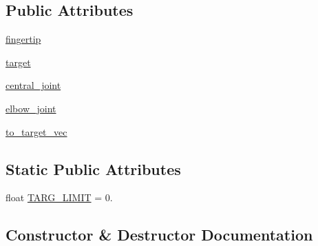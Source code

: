 \subsection*{Public Attributes}
\begin{DoxyCompactItemize}
\item 
\hyperlink{classpybullet-gym_1_1pybulletgym_1_1envs_1_1mujoco_1_1robots_1_1manipulators_1_1reacher_1_1_reacher_a02419457d08c665163da2a7c01dc09d4}{fingertip}
\item 
\hyperlink{classpybullet-gym_1_1pybulletgym_1_1envs_1_1mujoco_1_1robots_1_1manipulators_1_1reacher_1_1_reacher_a8ed74b561a6e1333e5eb71a3ed404280}{target}
\item 
\hyperlink{classpybullet-gym_1_1pybulletgym_1_1envs_1_1mujoco_1_1robots_1_1manipulators_1_1reacher_1_1_reacher_a6adfa35a0532001ad2495f6a8a04e8e3}{central\+\_\+joint}
\item 
\hyperlink{classpybullet-gym_1_1pybulletgym_1_1envs_1_1mujoco_1_1robots_1_1manipulators_1_1reacher_1_1_reacher_a5ae75eaf78e95bd4e0b3a055cdfbe57d}{elbow\+\_\+joint}
\item 
\hyperlink{classpybullet-gym_1_1pybulletgym_1_1envs_1_1mujoco_1_1robots_1_1manipulators_1_1reacher_1_1_reacher_aafccf9c853d8c4dc6b0d85764bce1508}{to\+\_\+target\+\_\+vec}
\end{DoxyCompactItemize}
\subsection*{Static Public Attributes}
\begin{DoxyCompactItemize}
\item 
float \hyperlink{classpybullet-gym_1_1pybulletgym_1_1envs_1_1mujoco_1_1robots_1_1manipulators_1_1reacher_1_1_reacher_a56f3581eee3e02dc7b43b66d91130a0e}{T\+A\+R\+G\+\_\+\+L\+I\+M\+IT} = 0.
\end{DoxyCompactItemize}


\subsection{Constructor \& Destructor Documentation}
